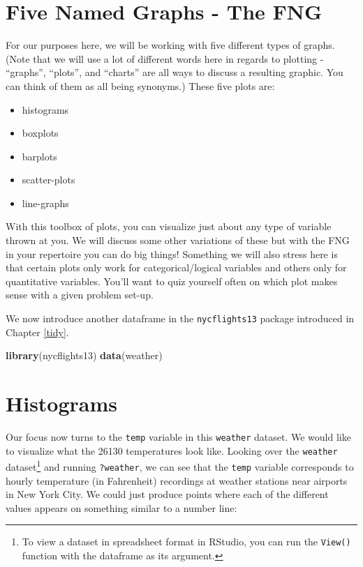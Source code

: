 \documentclass[]{tufte-book}
\newenvironment{Shaded}{\begin{snugshade}}{\end{snugshade}}
\newcommand{\KeywordTok}[1]{\textcolor[rgb]{0.13,0.29,0.53}{\textbf{{#1}}}}
\newcommand{\NormalTok}[1]{{#1}}
\providecommand{\tightlist}{%
  \setlength{\itemsep}{0pt}\setlength{\parskip}{0pt}}
\begin{document}
\section{Five Named Graphs - The FNG}\label{five-named-graphs---the-fng}

For our purposes here, we will be working with five different types of
graphs. (Note that we will use a lot of different words here in regards
to plotting - ``graphs'', ``plots'', and ``charts'' are all ways to
discuss a resulting graphic. You can think of them as all being
synonyms.) These five plots are:

\begin{itemize}
\tightlist
\item
  histograms
\item
  boxplots
\item
  barplots
\item
  scatter-plots
\item
  line-graphs
\end{itemize}

With this toolbox of plots, you can visualize just about any type of
variable thrown at you. We will discuss some other variations of these
but with the FNG in your repertoire you can do big things! Something we
will also stress here is that certain plots only work for
categorical/logical variables and others only for quantitative
variables. You'll want to quiz yourself often on which plot makes sense
with a given problem set-up.

We now introduce another dataframe in the \texttt{nycflights13} package
introduced in Chapter \ref{tidy}.

\begin{Shaded}
\begin{Highlighting}[]
\KeywordTok{library}\NormalTok{(nycflights13)}
\KeywordTok{data}\NormalTok{(weather)}
\end{Highlighting}
\end{Shaded}

\section{Histograms}\label{histograms}

Our focus now turns to the \texttt{temp} variable in this
\texttt{weather} dataset. We would like to visualize what the 26130
temperatures look like. Looking over the \texttt{weather}
dataset\footnote{To view a dataset in spreadsheet format in RStudio, you
  can run the \texttt{View()} function with the dataframe as its
  argument.} and running \texttt{?weather}, we can see that the
\texttt{temp} variable corresponds to hourly temperature (in Fahrenheit)
recordings at weather stations near airports in New York City. We could
just produce points where each of the different values appears on
something similar to a number line:
\end{document}
